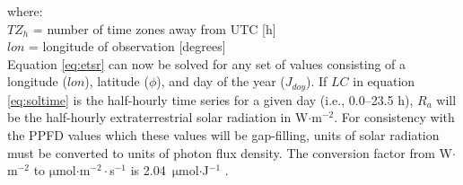 \noindent where: \\
\indent $TZ_{h}$ = number of time zones away from UTC [h] \\
\indent $lon$ = longitude of observation [degrees] \\

Equation \ref{eq:etsr} can now be solved for any set of values consisting of a longitude ($lon$), latitude ($\phi$), and day of the year ($J_{doy}$).  
If $LC$ in equation \ref{eq:soltime} is the half-hourly time series for a given day (i.e., 0.0--23.5 h), $R_{a}$ will be the half-hourly extraterrestrial solar radiation in W$\cdot$m$^{-2}$.  
For consistency with the PPFD values which these values will be gap-filling, units of solar radiation must be converted to units of photon flux density.  
The conversion factor from W$\cdot$m$^{-2}$ to $\mathrm{\mu}$mol$\cdot$m$^{-2}\cdot$s$^{-1}$ is 2.04~$\mathrm{\mu}$mol$\cdot$J$^{-1}$ \parencite{meek84,chen93}.

